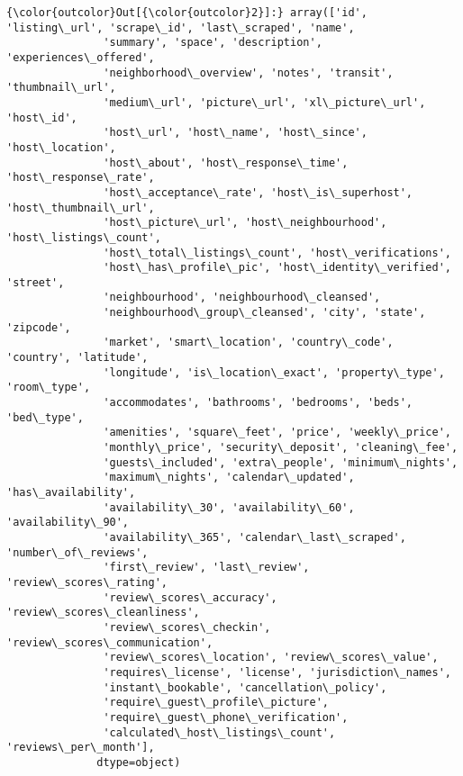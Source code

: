 \documentclass[11pt]{article}
\begin{document}
\begin{Verbatim}[commandchars=\\\{\}]
{\color{outcolor}Out[{\color{outcolor}2}]:} array(['id', 'listing\_url', 'scrape\_id', 'last\_scraped', 'name',
               'summary', 'space', 'description', 'experiences\_offered',
               'neighborhood\_overview', 'notes', 'transit', 'thumbnail\_url',
               'medium\_url', 'picture\_url', 'xl\_picture\_url', 'host\_id',
               'host\_url', 'host\_name', 'host\_since', 'host\_location',
               'host\_about', 'host\_response\_time', 'host\_response\_rate',
               'host\_acceptance\_rate', 'host\_is\_superhost', 'host\_thumbnail\_url',
               'host\_picture\_url', 'host\_neighbourhood', 'host\_listings\_count',
               'host\_total\_listings\_count', 'host\_verifications',
               'host\_has\_profile\_pic', 'host\_identity\_verified', 'street',
               'neighbourhood', 'neighbourhood\_cleansed',
               'neighbourhood\_group\_cleansed', 'city', 'state', 'zipcode',
               'market', 'smart\_location', 'country\_code', 'country', 'latitude',
               'longitude', 'is\_location\_exact', 'property\_type', 'room\_type',
               'accommodates', 'bathrooms', 'bedrooms', 'beds', 'bed\_type',
               'amenities', 'square\_feet', 'price', 'weekly\_price',
               'monthly\_price', 'security\_deposit', 'cleaning\_fee',
               'guests\_included', 'extra\_people', 'minimum\_nights',
               'maximum\_nights', 'calendar\_updated', 'has\_availability',
               'availability\_30', 'availability\_60', 'availability\_90',
               'availability\_365', 'calendar\_last\_scraped', 'number\_of\_reviews',
               'first\_review', 'last\_review', 'review\_scores\_rating',
               'review\_scores\_accuracy', 'review\_scores\_cleanliness',
               'review\_scores\_checkin', 'review\_scores\_communication',
               'review\_scores\_location', 'review\_scores\_value',
               'requires\_license', 'license', 'jurisdiction\_names',
               'instant\_bookable', 'cancellation\_policy',
               'require\_guest\_profile\_picture',
               'require\_guest\_phone\_verification',
               'calculated\_host\_listings\_count', 'reviews\_per\_month'],
              dtype=object)
\end{Verbatim}
            
\end{document}
